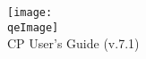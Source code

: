 \begin{center}
\def\version{7.1}
\def\qeImage{../../Doc/quantum_espresso}


  \texttt{[image: \\qeImage]} \\
  
	       \vspace{5.5cm}
  \Huge CP User's Guide (v.\version) 
\end{center}
